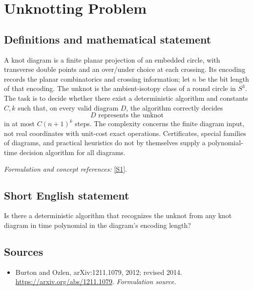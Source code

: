 \documentclass[11pt]{article}
\begin{document}
\section*{\texorpdfstring{Unknotting Problem}{Unknotting Problem}}\label{statement}
\subsection{Definitions and mathematical statement}
A knot diagram is a finite planar projection of an embedded circle, with transverse double points and an over/under choice at each crossing. Its encoding records the planar combinatorics and crossing information; let $n$ be the bit length of that encoding. The unknot is the ambient-isotopy class of a round circle in $S^3$. The task is to decide whether there exist a deterministic algorithm and constants $C,k$ such that, on every valid diagram $D$, the algorithm correctly decides
\[
 D\text{ represents the unknot}
\]
in at most $C(n+1)^k$ steps. The complexity concerns the finite diagram input, not real coordinates with unit-cost exact operations. Certificates, special families of diagrams, and practical heuristics do not by themselves supply a polynomial-time decision algorithm for all diagrams.
\par\smallskip\textit{Formulation and concept references:} \href{https://arxiv.org/abs/1211.1079}{[S1]}.

\subsection{Short English statement}
Is there a deterministic algorithm that recognizes the unknot from any knot diagram in time polynomial in the diagram's encoding length?
\subsection{Sources}
\begin{itemize}
\item[S1]Burton and Ozlen, arXiv:1211.1079, 2012; revised 2014.
\url{https://arxiv.org/abs/1211.1079}.
\textit{Formulation source.}
\end{itemize}
\end{document}
